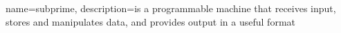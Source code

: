 {
  name=subprime,
  description={is a programmable machine that receives input,
               stores and manipulates data, and provides
               output in a useful format}
}
